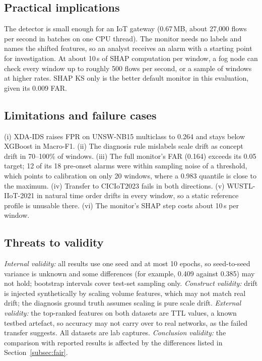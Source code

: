 \documentclass[pdflatex,sn-mathphys-num]{sn-jnl}%
\begin{document}
\subsection{Practical implications}
The detector is small enough for an IoT gateway (0.67\,MB, about 27{,}000 flows per second in batches on one CPU thread). The monitor needs no labels and names the shifted features, so an analyst receives an alarm with a starting point for investigation. At about 10\,s of SHAP computation per window, a fog node can check every window up to roughly 500 flows per second, or a sample of windows at higher rates. SHAP KS only is the better default monitor in this evaluation, given its 0.009 FAR.

\subsection{Limitations and failure cases}
(i) XDA-IDS raises FPR on UNSW-NB15 multiclass to 0.264 and stays below XGBoost in Macro-F1. (ii) The diagnosis rule mislabels scale drift as concept drift in 70--100\% of windows. (iii) The full monitor's FAR (0.164) exceeds its 0.05 target; 12 of its 18 pre-onset alarms were within sampling noise of a threshold, which points to calibration on only 20 windows, where a 0.983 quantile is close to the maximum. (iv) Transfer to CICIoT2023 fails in both directions. (v) WUSTL-IIoT-2021 in natural time order drifts in every window, so a static reference profile is unusable there. (vi) The monitor's SHAP step costs about 10\,s per window.

\subsection{Threats to validity}
\textit{Internal validity:} all results use one seed and at most 10 epochs, so seed-to-seed variance is unknown and some differences (for example, 0.409 against 0.385) may not hold; bootstrap intervals cover test-set sampling only. \textit{Construct validity:} drift is injected synthetically by scaling volume features, which may not match real drift; the diagnosis ground truth assumes scaling is pure scale drift. \textit{External validity:} the top-ranked features on both datasets are TTL values, a known testbed artefact, so accuracy may not carry over to real networks, as the failed transfer suggests. All datasets are lab captures. \textit{Conclusion validity:} the comparison with reported results is affected by the differences listed in Section~\ref{subsec:fair}.
\end{document}
